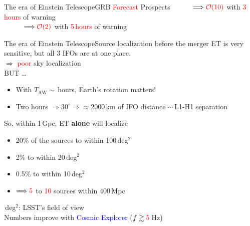 \documentclass[xcolor=dvipsnames,t]{beamer}
\newcommand{\red}[1]{\textcolor{red}{#1}}
\newcommand{\bl}[1]{\textcolor{blue}{#1}}
\newcommand{\ord}{\mathcal{O}}
\begin{document}
\begin{frame}{The era of Einstein Telescope}{GRB \red{Forecast} Prospects }
  \vspace{1mm}
  \textcolor{white}{ET-C} $\Longrightarrow \red{\ord(10)}$ with \red{3\,hours} of warning \\
  \vspace{1mm}
  \textcolor{white}{ET-C} $\Longrightarrow \red{\ord(2)}$ with \red{5\,hours} of warning
\end{frame}

\begin{frame}{The era of Einstein Telescope}{Source localization before the merger} 
  ET is very sensitive, but all 3 IFOs are at one place. \\
  \vspace{1mm}
  $\Longrightarrow$ \red{poor} sky localization \\
  \vspace{1mm}
  BUT \ldots \\
  \begin{itemize}
  \item With $T_\text{AW} \sim\,$hours, Earth's rotation matters!
  \item Two hours $\Rightarrow 30^\circ \Rightarrow \approx 2000\,$km of IFO distance $\sim\,$L1-H1 separation
  \end{itemize}
  So, within 1\,Gpc, ET {\bf alone} will localize
  \begin{itemize}
  \item 20\% of the sources to within 100\,deg$^2$
  \item 2\% to within 20\,deg$^2$
  \item 0.5\% to within 10\,deg$^2$ 
  \item[]$\Longrightarrow \red{5}$ to \red{10} sources within 400\,Mpc
  \end{itemize}
  \,deg$^2$: LSST's field of view\\
   Numbers improve with \bl{Cosmic Explorer} ($f\gtrsim \red{5}\,$Hz)
\end{frame}
\end{document}
